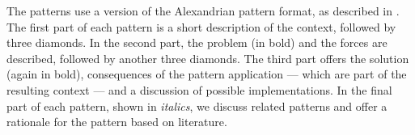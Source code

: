 The patterns use a version of the Alexandrian pattern format, as described in \cite{alexander1977}. The first part of each pattern is a short description of the context, followed by three diamonds. In the second part, the problem (in bold) and the forces are described, followed by another three diamonds. The third part offers the solution (again in bold), consequences of the pattern application --- which are part of the resulting context --- and a discussion of possible implementations. In the final part of each pattern, shown in \textit{italics}, we discuss related patterns and offer a rationale for the pattern based on literature.

